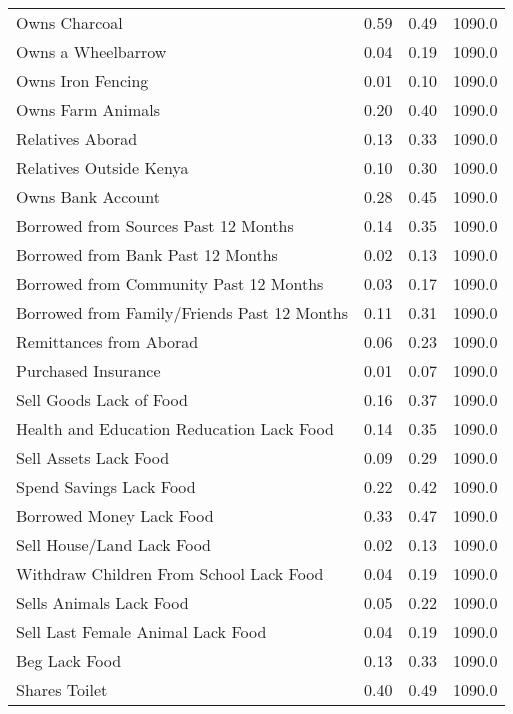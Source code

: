 \begin{longtable}{lrrr}
Owns Charcoal                                      &  0.59 &  0.49 &  1090.0 \\
Owns a Wheelbarrow                                 &  0.04 &  0.19 &  1090.0 \\
Owns Iron Fencing                                  &  0.01 &  0.10 &  1090.0 \\
Owns Farm Animals                                  &  0.20 &  0.40 &  1090.0 \\
Relatives Aborad                                   &  0.13 &  0.33 &  1090.0 \\
Relatives Outside Kenya                            &  0.10 &  0.30 &  1090.0 \\
Owns Bank Account                                  &  0.28 &  0.45 &  1090.0 \\
Borrowed from Sources Past 12 Months               &  0.14 &  0.35 &  1090.0 \\
Borrowed from Bank Past 12 Months                  &  0.02 &  0.13 &  1090.0 \\
Borrowed from Community Past 12 Months             &  0.03 &  0.17 &  1090.0 \\
Borrowed from Family/Friends Past 12 Months        &  0.11 &  0.31 &  1090.0 \\
Remittances from Aborad                            &  0.06 &  0.23 &  1090.0 \\
Purchased Insurance                                &  0.01 &  0.07 &  1090.0 \\
Sell Goods Lack of Food                            &  0.16 &  0.37 &  1090.0 \\
Health and Education Reducation Lack Food          &  0.14 &  0.35 &  1090.0 \\
Sell Assets Lack Food                              &  0.09 &  0.29 &  1090.0 \\
Spend Savings Lack Food                            &  0.22 &  0.42 &  1090.0 \\
Borrowed Money Lack Food                           &  0.33 &  0.47 &  1090.0 \\
Sell House/Land Lack Food                          &  0.02 &  0.13 &  1090.0 \\
Withdraw Children From School Lack Food            &  0.04 &  0.19 &  1090.0 \\
Sells Animals Lack Food                            &  0.05 &  0.22 &  1090.0 \\
Sell Last Female Animal Lack Food                  &  0.04 &  0.19 &  1090.0 \\
 Beg Lack Food                                     &  0.13 &  0.33 &  1090.0 \\
Shares Toilet                                      &  0.40 &  0.49 &  1090.0 \\

\bottomrule
\end{longtable}